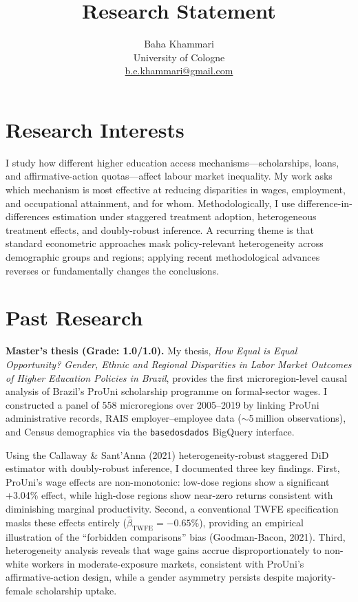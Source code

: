 \documentclass[a4paper,11pt]{article}
\title{Research Statement}
\author{Baha Khammari \\ University of Cologne \\ \href{mailto:b.e.khammari@gmail.com}{b.e.khammari@gmail.com}}
\date{}
\begin{document}
\maketitle
\thispagestyle{empty}

\section*{Research Interests}

I study how different higher education access mechanisms---scholarships, loans, and affirmative-action quotas---affect labour market inequality. My work asks which mechanism is most effective at reducing disparities in wages, employment, and occupational attainment, and for whom. Methodologically, I use difference-in-differences estimation under staggered treatment adoption, heterogeneous treatment effects, and doubly-robust inference. A recurring theme is that standard econometric approaches mask policy-relevant heterogeneity across demographic groups and regions; applying recent methodological advances reverses or fundamentally changes the conclusions.

\section*{Past Research}

\textbf{Master's thesis (Grade: 1.0/1.0).} My thesis, \textit{How Equal is Equal Opportunity? Gender, Ethnic and Regional Disparities in Labor Market Outcomes of Higher Education Policies in Brazil}, provides the first microregion-level causal analysis of Brazil's ProUni scholarship programme on formal-sector wages. I constructed a panel of 558 microregions over 2005--2019 by linking ProUni administrative records, RAIS employer--employee data ($\sim$5\,million observations), and Census demographics via the \texttt{basedosdados} BigQuery interface.

Using the Callaway \& Sant'Anna (2021) heterogeneity-robust staggered DiD estimator with doubly-robust inference, I documented three key findings. First, ProUni's wage effects are non-monotonic: low-dose regions show a significant +3.04\% effect, while high-dose regions show near-zero returns consistent with diminishing marginal productivity. Second, a conventional TWFE specification masks these effects entirely ($\hat{\beta}_{\text{TWFE}} = -0.65\%$), providing an empirical illustration of the ``forbidden comparisons'' bias (Goodman-Bacon, 2021). Third, heterogeneity analysis reveals that wage gains accrue disproportionately to non-white workers in moderate-exposure markets, consistent with ProUni's affirmative-action design, while a gender asymmetry persists despite majority-female scholarship uptake.
\end{document}
